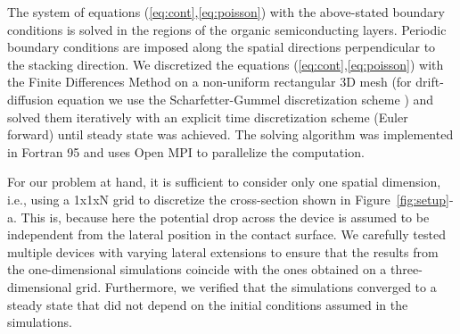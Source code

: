 \documentclass[%
9pt,
 aip,
rsi,%
 amsmath,amssymb,
preprint,%
]{revtex4-1}
\begin{document}
The system of equations (\ref{eq:cont},\ref{eq:poisson}) with the above-stated boundary conditions is solved in the regions of the organic semiconducting layers. 
Periodic boundary conditions are imposed along the spatial directions perpendicular to the stacking direction.
We discretized the equations (\ref{eq:cont},\ref{eq:poisson}) with the Finite Differences Method on a non-uniform rectangular 3D mesh (for drift-diffusion equation we use the Scharfetter-Gummel discretization scheme \cite{SG}) and solved them iteratively with an explicit time discretization scheme (Euler forward) until steady state was achieved.
The solving algorithm was implemented in Fortran 95 and uses Open MPI to parallelize the computation. 

For our problem at hand, it is sufficient to consider only one spatial dimension, i.e., using a 1x1xN grid to discretize the cross-section shown in Figure~\ref{fig:setup}-a. 
This is, because here the potential drop across the device is assumed to be independent from the lateral position in the contact surface.
We carefully tested multiple devices with varying lateral extensions to ensure that the results from the one-dimensional simulations coincide with the ones obtained on a three-dimensional grid.
Furthermore, we verified that the simulations converged to a steady state that did not depend on the initial conditions assumed in the simulations.
\end{document}
